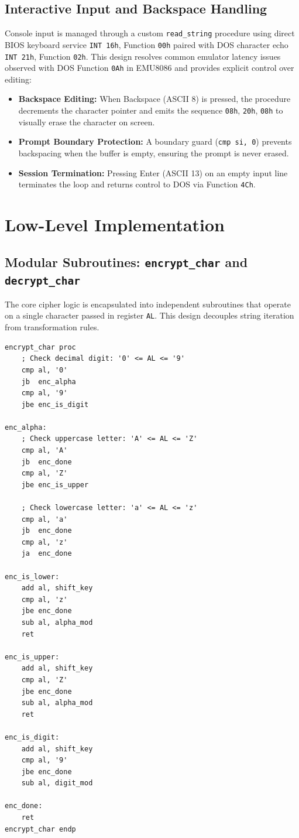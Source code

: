 \documentclass[11pt,a4paper]{article}
\begin{document}
\subsection{Interactive Input and Backspace Handling}
Console input is managed through a custom \texttt{read\_string} procedure using direct BIOS keyboard service \texttt{INT 16h}, Function \texttt{00h} paired with DOS character echo \texttt{INT 21h}, Function \texttt{02h}. This design resolves common emulator latency issues observed with DOS Function \texttt{0Ah} in EMU8086 and provides explicit control over editing:
\begin{itemize}
    \item \textbf{Backspace Editing:} When Backspace (ASCII 8) is pressed, the procedure decrements the character pointer and emits the sequence \texttt{08h}, \texttt{20h}, \texttt{08h} to visually erase the character on screen.
    \item \textbf{Prompt Boundary Protection:} A boundary guard (\texttt{cmp si, 0}) prevents backspacing when the buffer is empty, ensuring the prompt is never erased.
    \item \textbf{Session Termination:} Pressing Enter (ASCII 13) on an empty input line terminates the loop and returns control to DOS via Function \texttt{4Ch}.
\end{itemize}

\section{Low-Level Implementation}

\subsection{Modular Subroutines: \texttt{encrypt\_char} and \texttt{decrypt\_char}}
The core cipher logic is encapsulated into independent subroutines that operate on a single character passed in register \texttt{AL}. This design decouples string iteration from transformation rules.

\begin{lstlisting}[style=asmcode,caption={Modular character encryption subroutine}]
encrypt_char proc
    ; Check decimal digit: '0' <= AL <= '9'
    cmp al, '0'
    jb  enc_alpha
    cmp al, '9'
    jbe enc_is_digit

enc_alpha:
    ; Check uppercase letter: 'A' <= AL <= 'Z'
    cmp al, 'A'
    jb  enc_done
    cmp al, 'Z'
    jbe enc_is_upper

    ; Check lowercase letter: 'a' <= AL <= 'z'
    cmp al, 'a'
    jb  enc_done
    cmp al, 'z'
    ja  enc_done

enc_is_lower:
    add al, shift_key
    cmp al, 'z'
    jbe enc_done
    sub al, alpha_mod
    ret

enc_is_upper:
    add al, shift_key
    cmp al, 'Z'
    jbe enc_done
    sub al, alpha_mod
    ret

enc_is_digit:
    add al, shift_key
    cmp al, '9'
    jbe enc_done
    sub al, digit_mod

enc_done:
    ret
encrypt_char endp
\end{lstlisting}
\end{document}
